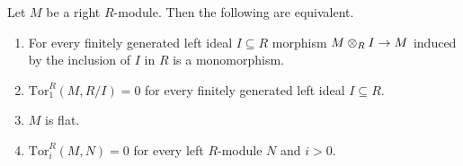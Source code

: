 \begin{proposition}\label{proposition:homologicalflatness}
Let $M$ be a right $R$-module. Then the following are equivalent.
\begin{enumerate}[label=\emph{\textbf{(\roman*)}}, leftmargin=1.5em]
\item For every finitely generated left ideal $I\subseteq R$ morphism $M\otimes_RI\rightarrow M$ induced by the inclusion of $I$ in $R$ is a monomorphism.
\item $\mathrm{Tor}^R_1(M,R/I)=0$ for every finitely generated left ideal $I\subseteq R$.
\item $M$ is flat.
\item $\mathrm{Tor}^R_i(M,N)=0$ for every left $R$-module $N$ and $i>0$.
\end{enumerate}
\end{proposition}
